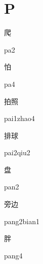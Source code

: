﻿%
\section*{P}

\begin{verbete}[pa2]{爬}
\begin{pronuncia}{pa2}
\end{pronuncia}
\end{verbete}

\begin{verbete}[pa4]{怕}
\begin{pronuncia}{pa4}
\end{pronuncia}
\end{verbete}

\begin{verbete}{拍照}
\begin{pronuncia}{pai1zhao4}
\end{pronuncia}
\end{verbete}

\begin{verbete}{排球}
\begin{pronuncia}{pai2qiu2}
\end{pronuncia}
\end{verbete}

\begin{verbete}[pan2]{盘}
\begin{pronuncia}{pan2}
\end{pronuncia}
\end{verbete}

\begin{verbete}{旁边}
\begin{pronuncia}{pang2bian1}
\end{pronuncia}
\end{verbete}

\begin{verbete}[pang4]{胖}
\begin{pronuncia}{pang4}
\end{pronuncia}
\end{verbete}

